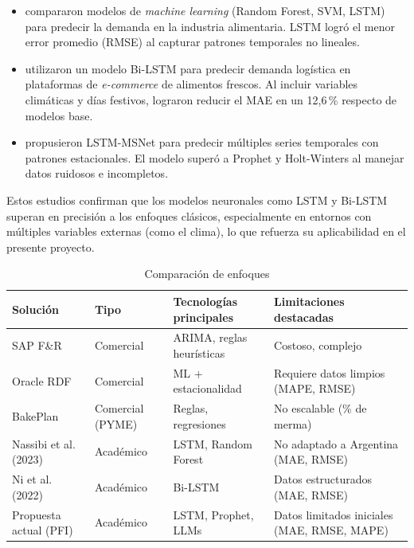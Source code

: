 \begin{itemize}
    \item \textcite{nassibi2023} compararon modelos de \textit{machine learning} (Random Forest, SVM, LSTM) para predecir la demanda en la industria alimentaria. LSTM logró el menor error promedio (RMSE) al capturar patrones temporales no lineales.

    \item \textcite{ni2022} utilizaron un modelo Bi-LSTM para predecir demanda logística en plataformas de \textit{e-commerce} de alimentos frescos. Al incluir variables climáticas y días festivos, lograron reducir el MAE en un 12{,}6\,\% respecto de modelos base.

    \item \textcite{bandara2020} propusieron LSTM-MSNet para predecir múltiples series temporales con patrones estacionales. El modelo superó a Prophet y Holt-Winters al manejar datos ruidosos e incompletos.
\end{itemize}

Estos estudios confirman que los modelos neuronales como LSTM y Bi-LSTM superan en precisión a los enfoques clásicos, especialmente en entornos con múltiples variables externas (como el clima), lo que refuerza su aplicabilidad en el presente proyecto.



\begin{table}[t]
    \centering
    \renewcommand{\arraystretch}{1.3}
    \caption{Comparación de enfoques}
    \label{tab:comparacion}
    \begin{tabular}{|p{2.9cm}|p{2cm}|p{3cm}|p{5cm}|}
        \hline
        \textbf{Solución} & \textbf{Tipo} & \textbf{Tecnologías principales} & \textbf{Limitaciones destacadas} \\
        \hline
        SAP F\&R & Comercial & ARIMA, reglas heurísticas & Costoso, complejo \\
        \hline
        Oracle RDF & Comercial & ML + estacionalidad & Requiere datos limpios (MAPE, RMSE) \\
        \hline
        BakePlan & Comercial (PYME) & Reglas, regresiones & No escalable (\% de merma) \\
        \hline
        Nassibi et al. (2023) & Académico & LSTM, Random Forest & No adaptado a Argentina (MAE, RMSE) \\
        \hline
        Ni et al. (2022) & Académico & Bi-LSTM & Datos estructurados (MAE, RMSE) \\
        \hline
        Propuesta actual (PFI) & Académico & LSTM, Prophet, LLMs & Datos limitados iniciales (MAE, RMSE, MAPE) \\
        \hline
    \end{tabular}
\end{table}


